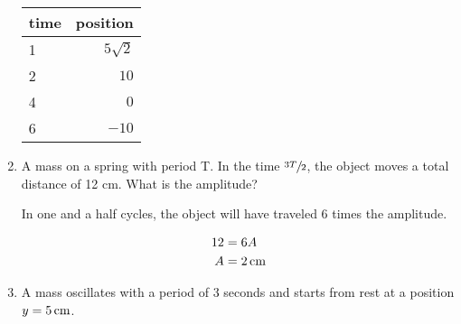 \documentclass{exam}
\begin{document}
\begin{enumerate}
\begin{solution}
        \begin{tabular}[H]{lr}
          \toprule
          time & position \\
          \midrule
          1 & $5 \sqrt{2}$ \\
          2 & $10$ \\
          4 & $0$ \\
          6 & $-10$ \\
          \bottomrule
        \end{tabular}
      \end{solution}

    \item A mass on a spring with period T.  In the time $\sfrac{3T}{2}$, the object moves a total distance of 12 cm.  
      What is the amplitude?

      \begin{solution}
        In one and a half cycles, the object will have traveled 6 times the amplitude.

        \begin{align*}
          12 & = 6 A \\
          A  & = \unit[2]{cm} \\
        \end{align*}
        
      \end{solution}
    \item A mass oscillates with a period of 3 seconds and starts from rest at a position $y = \unit[5]{cm}$.


\end{enumerate}
\end{document}
